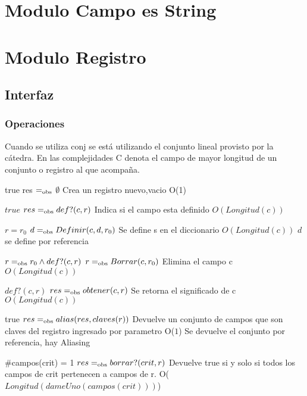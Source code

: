 
\section{Modulo Campo es String}
\section{Modulo Registro}

\subsection{Interfaz}




\subsubsection*{Operaciones}
Cuando se utiliza conj se está utilizando el conjunto lineal provisto por la cátedra. En las complejidades C denota el campo de mayor longitud de un conjunto o registro al que acompaña.

{true}
{res $=_{\mathrm{obs}}$ $\emptyset$}
{Crea un registro nuevo,vacio}
{O(1)}
{}

  {$true$}
  {$res =_{\mathrm{obs}} def?(c,r)$}
  {Indica si el campo esta definido}
  {$O(Longitud(c))$}
  {}

  {$r=r_0$}
  {$d =_{\mathrm{obs}} Definir(c, d, r_0)$}
  {Se define s en el diccionario}
  {$O(Longitud(c))$}
  {$d$ se define por referencia}

 {$r =_{\mathrm{obs}} r_0 \land def?(c,r)$}
 {$r =_{\mathrm{obs}} Borrar(c,r_0)$}
 {Elimina el campo c}
 {$O(Longitud(c))$}
 {}

 {$def?(c,r)$}
 {$res =_{\mathrm{obs}} obtener(c,r)$}
 {Se retorna el significado de c}
 {$O(Longitud(c))$}
 {}

 {true}
 {$res =_{\mathrm{obs}} alias(res, claves(r))$}
 {Devuelve un conjunto de campos que son claves del registro ingresado por parametro}
 {O($1$)}
 {Se devuelve el conjunto por referencia, hay Aliasing}

\newpage
{}
 {$\#$campos(crit) = 1}
 {$res =_{\mathrm{obs}} borrar?(crit, r)$}
 {Devuelve true si y solo si todos los campos de crit pertenecen a campos de r.}
 {O($Longitud(dameUno(campos(crit)))$)} 
 {}

